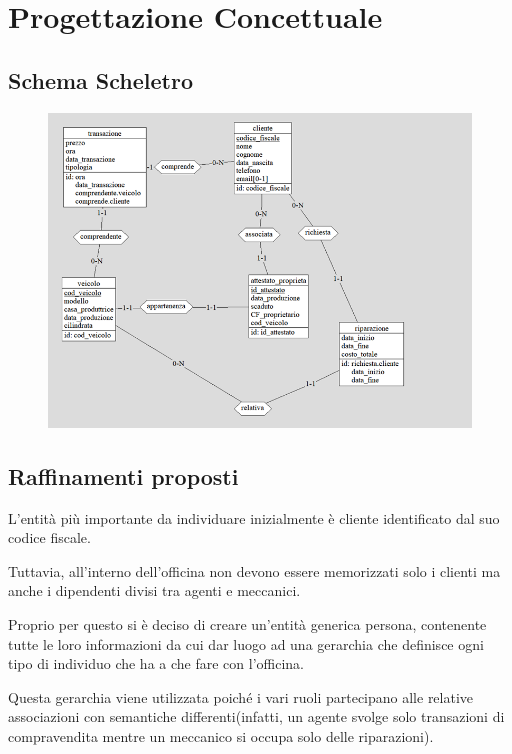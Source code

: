 \documentclass[a4paper,12pt]{report}
\begin{document}
\chapter{Progettazione Concettuale}

\section{Schema Scheletro}
	\begin{figure}[H]
		\centering
		\includegraphics[scale=1]{img/schema_scheletro.png}
	\end{figure}

\section{Raffinamenti proposti}
L’entità più importante da individuare inizialmente è cliente identificato dal suo codice fiscale.

Tuttavia, all’interno dell’officina non devono essere memorizzati solo i clienti ma anche i dipendenti divisi tra agenti e meccanici.

Proprio per questo si è deciso di creare un’entità generica persona, contenente tutte le loro informazioni da cui dar luogo ad una
%
gerarchia che definisce ogni tipo di individuo che ha a che fare con l’officina.

Questa gerarchia viene utilizzata poiché i vari ruoli partecipano alle relative associazioni con semantiche differenti(infatti, un
%
agente svolge solo transazioni di compravendita mentre un meccanico si occupa solo delle riparazioni).
\end{document}
